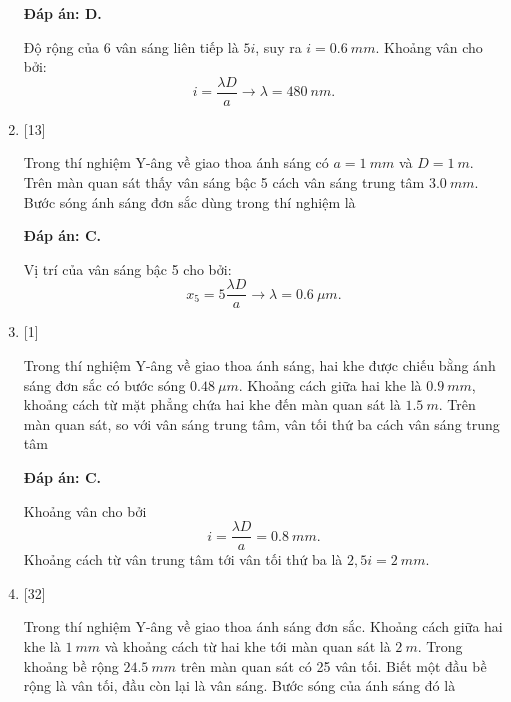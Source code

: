 \begin{enumerate}[label=\bfseries Câu \arabic*:]
	\loigiai
	{		\textbf{Đáp án: D.}
		
		Độ rộng của 6 vân sáng liên tiếp là $5i$, suy ra $i = \SI{0,6}{mm}$.
		Khoảng vân cho bởi:
		$$
		i = \dfrac{\lambda D}{a} \rightarrow \lambda = \SI{480}{nm}.
		$$
	}
	
	\item {} [13]
	\cauhoi
	{Trong thí nghiệm Y-âng về giao thoa ánh sáng có $a = \SI{1}{mm}$ và $D = \SI{1}{m}$. Trên màn quan sát thấy vân sáng bậc 5 cách vân sáng trung tâm $\SI{3,0}{mm}$. Bước sóng ánh sáng đơn sắc dùng trong thí nghiệm là
	}
	
	\loigiai
	{		\textbf{Đáp án: C.}
		
		Vị trí của vân sáng bậc 5 cho bởi:
		$$
		x_{5} = 5 \dfrac{\lambda D}{a} \rightarrow \lambda = \SI{0,6}{\mu m}.
		$$
	}
	
	\item {} [1]
	\cauhoi
	{Trong thí nghiệm Y-âng về giao thoa ánh sáng, hai khe được chiếu bằng ánh sáng đơn sắc có bước sóng $\SI{0,48}{\mu m}$. Khoảng cách giữa hai khe là $\SI{0.9}{mm}$, khoảng cách từ mặt phẳng chứa hai khe đến màn quan sát là $\SI{1,5}{m}$. Trên màn quan sát, so với vân sáng trung tâm, vân tối thứ ba cách vân sáng trung tâm
	}
	
	\loigiai
	{		\textbf{Đáp án: C.}
		
		Khoảng vân cho bởi
		$$
		i = \dfrac{\lambda D}{a} = \SI{0,8}{mm}.
		$$
		Khoảng cách từ vân trung tâm tới vân tối thứ ba là $2,5i = \SI{2}{mm}$.
	}
	
	\item {} [32]
	\cauhoi
	{Trong thí nghiệm Y-âng về giao thoa ánh sáng đơn sắc. Khoảng cách giữa hai khe là $\SI{1}{mm}$ và khoảng cách từ hai khe tới màn quan sát là $\SI{2}{m}$. Trong khoảng bề rộng $\SI{24,5}{mm}$ trên màn quan sát có 25 vân tối. Biết một đầu bề rộng là vân tối, đầu còn lại là vân sáng. Bước sóng của ánh sáng đó là
	}
	

\end{enumerate}
